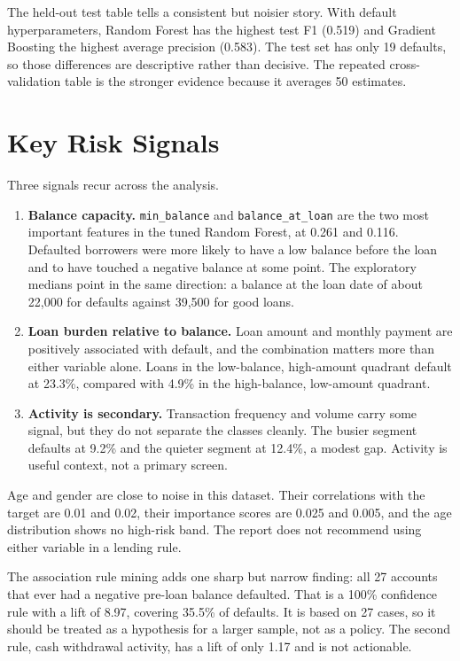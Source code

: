 The held-out test table tells a consistent but noisier story. With default hyperparameters, Random Forest has the highest test F1 (0.519) and Gradient Boosting the highest average precision (0.583). The test set has only 19 defaults, so those differences are descriptive rather than decisive. The repeated cross-validation table is the stronger evidence because it averages 50 estimates.

\section{Key Risk Signals}
\label{sec:key-signals}

Three signals recur across the analysis.

\begin{enumerate}
    \item \textbf{Balance capacity.} \texttt{min\_balance} and \texttt{balance\_at\_loan} are the two most important features in the tuned Random Forest, at 0.261 and 0.116. Defaulted borrowers were more likely to have a low balance before the loan and to have touched a negative balance at some point. The exploratory medians point in the same direction: a balance at the loan date of about 22,000 for defaults against 39,500 for good loans.
    \item \textbf{Loan burden relative to balance.} Loan amount and monthly payment are positively associated with default, and the combination matters more than either variable alone. Loans in the low-balance, high-amount quadrant default at 23.3\%, compared with 4.9\% in the high-balance, low-amount quadrant.
    \item \textbf{Activity is secondary.} Transaction frequency and volume carry some signal, but they do not separate the classes cleanly. The busier segment defaults at 9.2\% and the quieter segment at 12.4\%, a modest gap. Activity is useful context, not a primary screen.
\end{enumerate}

Age and gender are close to noise in this dataset. Their correlations with the target are 0.01 and 0.02, their importance scores are 0.025 and 0.005, and the age distribution shows no high-risk band. The report does not recommend using either variable in a lending rule.

The association rule mining adds one sharp but narrow finding: all 27 accounts that ever had a negative pre-loan balance defaulted. That is a 100\% confidence rule with a lift of 8.97, covering 35.5\% of defaults. It is based on 27 cases, so it should be treated as a hypothesis for a larger sample, not as a policy. The second rule, cash withdrawal activity, has a lift of only 1.17 and is not actionable.

